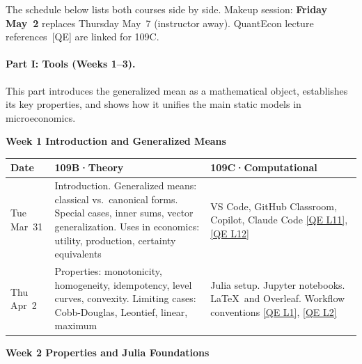 The schedule below lists both courses side by side.
Makeup session: \textbf{Friday May~2} replaces Thursday May~7 (instructor away).
QuantEcon lecture references~[QE] are linked for 109C.

\paragraph{Part I: Tools (Weeks 1--3).}
This part introduces the generalized mean as a mathematical object, establishes its key properties, and shows how it unifies the main static models in microeconomics.

\vspace{0.5em}
\noindent\textbf{Week 1 \hfill Introduction and Generalized Means}
\vspace{0.3em}

\begin{tabularx}{\textwidth}{@{}p{2.1cm}YY@{}}
\toprule
\textbf{Date} & \textbf{109B\enspace·\enspace Theory} & \textbf{109C\enspace·\enspace Computational} \\
\midrule
Tue Mar~31 &
Introduction. Generalized means: classical vs.\ canonical forms. Special cases, inner sums, vector generalization. Uses in economics: utility, production, certainty equivalents &
VS Code, GitHub Classroom, Copilot, Claude Code \newline
\href{https://julia.quantecon.org/software_engineering/tools_editors.html}{[QE L11]},
\href{https://julia.quantecon.org/software_engineering/version_control.html}{[QE L12]} \\[4pt]
Thu Apr~2 &
Properties: monotonicity, homogeneity, idempotency, level curves, convexity. Limiting cases: Cobb-Douglas, Leontief, linear, maximum &
Julia setup. Jupyter notebooks. \LaTeX\ and Overleaf. Workflow conventions \newline
\href{https://julia.quantecon.org/getting_started_julia/getting_started.html}{[QE L1]},
\href{https://julia.quantecon.org/getting_started_julia/julia_by_example.html}{[QE L2]} \\
\bottomrule
\end{tabularx}

\vspace{0.8em}
\noindent\textbf{Week 2 \hfill Properties and Julia Foundations}
\vspace{0.3em}

